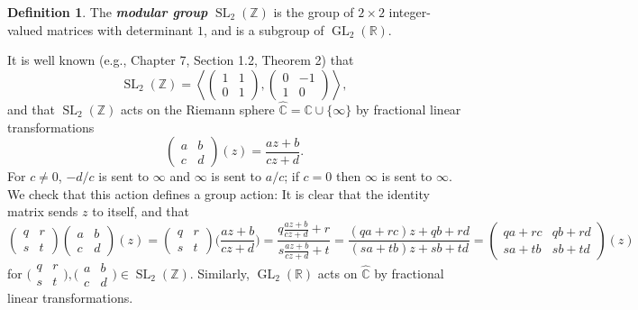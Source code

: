\documentclass[10pt,leqno,twoside,b5paper]{article}
\theoremstyle{plain}
\theoremstyle{definition}
\newtheorem{definition/}[lem]{Definition}
\newenvironment{definition}
  {\renewcommand{\qedsymbol}{\textdagger}%
   \pushQED{\qed}\begin{definition/}}
  {\popQED\end{definition/}}
\numberwithin{equation}{section}
\numberwithin{lem}{section}
\newcommand{\textib}[1]{\textbf{\textit{#1\index{#1}}}} %
\DeclareMathOperator{\GL}{GL}
\DeclareMathOperator{\SL}{SL}
\newcommand{\abcd}{\begin{pmatrix}
    a & b \\ c & d
\end{pmatrix}}
\newcommand{\slz}{\SL_2(\mathbb{Z})}
\newcommand{\glr}{\GL_2(\mathbb{R})}
\begin{document}
\begin{definition}
    The \textib{modular group} $\slz$ is the group of $2\times 2$ integer-valued matrices with determinant $1$, and is a subgroup of $\glr$.
\end{definition} 
It is well known (e.g., \cite{serre} Chapter 7, Section 1.2, Theorem 2) that 
\begin{equation}\label{eqn: generators modular group}
    \slz = \left\langle\begin{pmatrix}
        1 & 1 \\ 0 & 1
    \end{pmatrix}, \begin{pmatrix}
        0 & -1 \\ 1 & 0
    \end{pmatrix}\right\rangle, 
\end{equation}
and that $\slz$ acts on the Riemann sphere $\widehat{\mathbb{C}} = \mathbb{C}\cup \{\infty\}$ by fractional linear transformations
\[\abcd(z) = \frac{az + b}{cz + d}.\] For $c\neq 0$, $-d/c$ is sent to $\infty$ and $\infty$ is sent to $a/c$; if $c = 0$ then $\infty$ is sent to $\infty$. We check that this action defines a group action: It is clear that the identity matrix sends $z$ to itself, and that 
\[\begin{pmatrix}
    q & r \\ s & t
\end{pmatrix}\abcd(z) = \begin{pmatrix}
    q & r \\ s & t
\end{pmatrix}\Big(\frac{az+b}{cz+d}\Big) = \frac{q\frac{az+b}{cz+d}+r}{s\frac{az+b}{cz+d}+t} = \frac{(qa+rc)z+qb+rd}{(sa+tb)z+sb+td} = \begin{pmatrix}
    qa+rc & qb+rd \\ sa+tb & sb+td
\end{pmatrix}(z)\] for $\big(\!\begin{smallmatrix}
    q & r \\ s & t
\end{smallmatrix}\!\big),\big(\!\begin{smallmatrix}
    a & b \\ c & d
\end{smallmatrix}\!\big)\in \slz$. Similarly, $\glr$ acts on $\widehat{\mathbb C}$ by fractional linear transformations.
\end{document}
